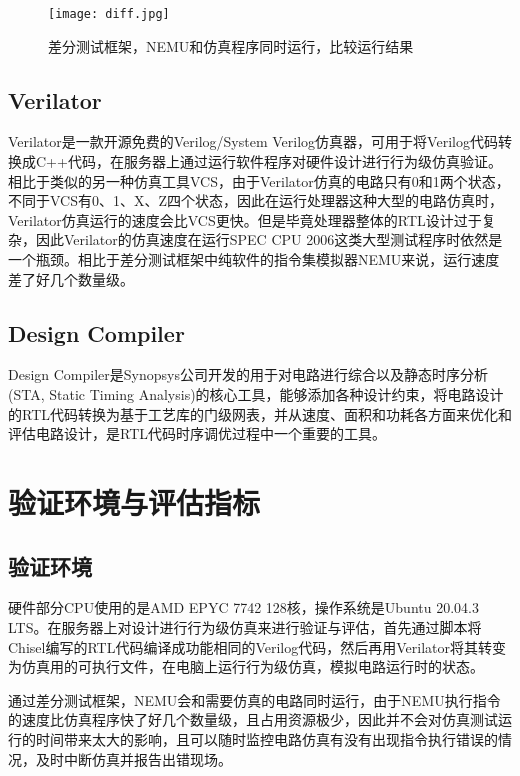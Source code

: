 \begin{figure}[htb]
	\centering
	\setlength\tabcolsep{3pt}  %
	\vspace{5pt} %
	\texttt{[image: diff.jpg]}
	\caption{差分测试框架，NEMU和仿真程序同时运行，比较运行结果}
	\label{fig:figure64}
\end{figure}

\subsection{Verilator}

Verilator\cite{verilator}是一款开源免费的Verilog/System Verilog仿真器，可用于将Verilog代码转换成C++代码，在服务器上通过运行软件程序对硬件设计进行行为级仿真验证。相比于类似的另一种仿真工具VCS\cite{vcs}，由于Verilator仿真的电路只有0和1两个状态，不同于VCS有0、1、X、Z四个状态，因此在运行处理器这种大型的电路仿真时，Verilator仿真运行的速度会比VCS更快。但是毕竟处理器整体的RTL设计过于复杂，因此Verilator的仿真速度在运行SPEC CPU 2006这类大型测试程序时依然是一个瓶颈。相比于差分测试框架中纯软件的指令集模拟器NEMU来说，运行速度差了好几个数量级。

\subsection{Design Compiler}

Design Compiler是Synopsys公司开发的用于对电路进行综合以及静态时序分析 (STA, Static Timing Analysis)的核心工具，能够添加各种设计约束，将电路设计的RTL代码转换为基于工艺库的门级网表，并从速度、面积和功耗各方面来优化和评估电路设计，是RTL代码时序调优过程中一个重要的工具。

\section{验证环境与评估指标}

\subsection{验证环境}

硬件部分CPU使用的是AMD EPYC 7742 128核，操作系统是Ubuntu 20.04.3 LTS。在服务器上对设计进行行为级仿真来进行验证与评估，首先通过脚本将Chisel编写的RTL代码编译成功能相同的Verilog代码，然后再用Verilator将其转变为仿真用的可执行文件，在电脑上运行行为级仿真，模拟电路运行时的状态。

通过差分测试框架，NEMU会和需要仿真的电路同时运行，由于NEMU执行指令的速度比仿真程序快了好几个数量级，且占用资源极少，因此并不会对仿真测试运行的时间带来太大的影响，且可以随时监控电路仿真有没有出现指令执行错误的情况，及时中断仿真并报告出错现场。

